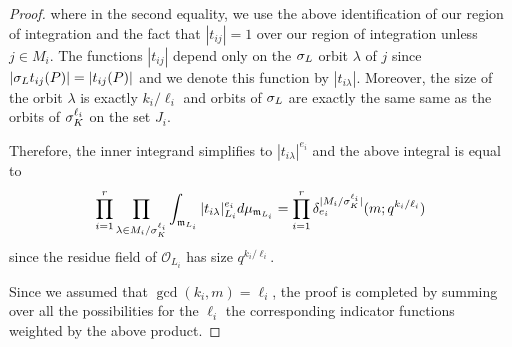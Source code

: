 \documentclass[10pt]{article}
\theoremstyle{plain}
\theoremstyle{definition}
\numberwithin{equation}{section}
\begin{document}
\begin{proof}
where in the second equality, we use the above identification of our region of integration and the fact that $|t_{ij}| = 1$ over our region of integration unless $j \in M_i$. The functions $|t_{ij}|$ depend only on the $\sigma_{L}$ orbit $\lambda$ of $j$ since $|\sigma_{L} t_{ij}(P)| = |t_{ij}(P)|$ and we denote this function by $|t_{i\lambda}|$. Moreover, the size of the orbit $\lambda$ is exactly $k_i/\ell_i$ and orbits of $\sigma_{L}$ are exactly the same same as the orbits of $\sigma_K^{\ell_i}$ on the set $J_i$.

Therefore, the inner integrand simplifies to $|t_{i\lambda}|^{e_i}$ and the above integral is equal to
\[\prod_{i=1}^r\prod_{\lambda \in M_i/\sigma_K^{\ell_i}}\int_{\mathfrak m_{{L}_i}}|t_{i\lambda}|_{{L}_i}^{e_i}d\mu_{\mathfrak m_{{L}_i}} = \prod_{i=1}^{r}\delta_{e_i}^{|M_i/\sigma_K^{\ell_i}|}(m;q^{k_i/\ell_i})\]
since the residue field of $\mathcal O_{L_i}$ has size $q^{k_i/\ell_i}$.

Since we assumed that $\gcd(k_i,m) = \ell_i$, the proof is completed by summing over all the possibilities for the $\ell_i$ the corresponding indicator functions weighted by the above product.

\end{proof}
\end{document}
